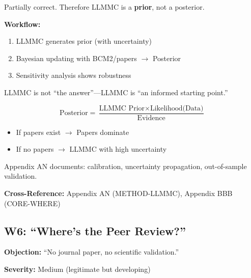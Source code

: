 \begin{axiom}
Partially correct. Therefore LLMMC is a \textbf{prior}, not a posterior.

\textbf{Workflow:}
\begin{enumerate}
    \item LLMMC generates prior (with uncertainty)
    \item Bayesian updating with BCM2/papers $\rightarrow$ Posterior
    \item Sensitivity analysis shows robustness
\end{enumerate}

LLMMC is not ``the answer''---LLMMC is ``an informed starting point.''

\begin{equation}
\text{Posterior} = \frac{\text{LLMMC Prior} \times \text{Likelihood(Data)}}{\text{Evidence}}
\end{equation}

\begin{itemize}[nosep]
    \item If papers exist $\rightarrow$ Papers dominate
    \item If no papers $\rightarrow$ LLMMC with high uncertainty
\end{itemize}

Appendix AN documents: calibration, uncertainty propagation, out-of-sample validation.
\end{axiom}

\textbf{Cross-Reference:} Appendix AN (METHOD-LLMMC), Appendix BBB (CORE-WHERE)

\subsection{W6: ``Where's the Peer Review?''}
\label{sec:da-w6}

\begin{tcolorbox}[colback=gray!5!white, colframe=gray!75!black]
\textbf{Objection:} ``No journal paper, no scientific validation.''

\textbf{Severity:} Medium (legitimate but developing)
\end{tcolorbox}

